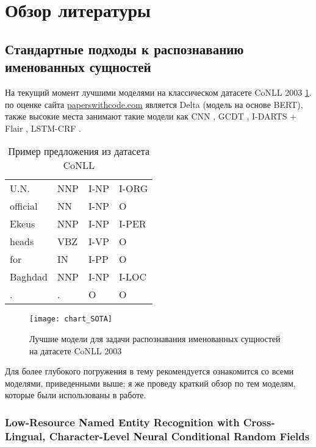 \section{Обзор литературы}

\subsection{Стандартные подходы к распознаванию именованных сущностей}

На текущий момент лучшими моделями на классическом датасете CoNLL 2003 \cite{tjong-kim-sang-de-meulder-2003-introduction} \ref{table:example_CoNLL}. по оценке сайта \href{https://paperswithcode.com/sota/named-entity-recognition-ner-on-conll-2003}{paperswithcode.com} является Delta \cite{delta} (модель на основе BERT), также высокие места занимают такие модели как CNN \cite{CNN_top_2_SOTA}, GCDT \cite{Liu:19}, I-DARTS + Flair \cite{jiang-etal-2019-improved}, LSTM-CRF \cite{strakova-etal-2019-neural}.

\begin{table}[h]
\caption{Пример предложения из датасета CoNLL}
\begin{tabular}{llll}
U.N. & NNP & I-NP & I-ORG \\
official & NN & I-NP & O \\
Ekeus & NNP & I-NP& I-PER \\
heads & VBZ & I-VP & O\\
for & IN & I-PP & O \\
Baghdad & NNP & I-NP & I-LOC \\
. & . & O & O
\end{tabular}
\label{table:example_CoNLL}
\end{table}

\begin{figure}[h]
\texttt{[image: chart\_SOTA]}
\label{fig:chart_SOTA}
\caption{Лучшие модели для задачи распознавания именованных сущностей на датасете CoNLL 2003}
\end{figure}

Для более глубокого погружения в тему рекомендуется ознакомится со всеми моделями, приведенными выше; я же проведу краткий обзор по тем моделям, которые были использованы в работе.

\subsubsection{Low-Resource Named Entity Recognition with Cross-Lingual, Character-Level Neural Conditional Random Fields}

